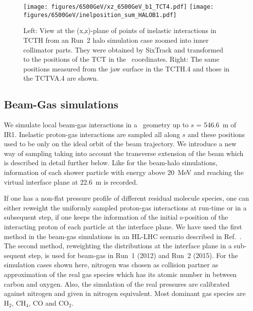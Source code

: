 \begin{figure}%
\begin{center}
  \texttt{[image: figures/6500GeV/xz\_6500GeV\_b1\_TCT4.pdf]}
  \texttt{[image: figures/6500GeV/inelposition\_sum\_HALOB1.pdf]}
\end{center}
\vspace{-0.6cm}
 \caption{Left: View at the (x,z)-plane of points of inelastic interactions in TCTH from an Run~2 halo simulation case zoomed into inner collimator parts. They were obtained by SixTrack and transformed to the positions of the TCT in the \fluka~coordinates. Right: The same positions measured from the jaw surface in the TCTH.4 and those in the TCTVA.4 are shown.
  \label{tctHits}}
\end{figure}


\subsection{Beam-Gas simulations \label{BGdescript}}

We simulate local beam-gas interactions in a \fluka~geometry up to $s$ = 546.6~m of IR1. Inelastic proton-gas interactions are sampled all along $s$ and these positions used to be only on the ideal orbit of the beam trajectory. We introduce a new way of sampling taking into account the transverse extension of the beam which is described in detail further below.
Like for the beam-halo simulations, information of each shower particle with energy above 20~MeV and reaching the virtual interface plane at 22.6~m is recorded.

If one has a non-flat pressure profile of different residual molecule species, one can either reweight the uniformly sampled proton-gas interactions at run-time or in a subsequent step, if one keeps the information of the initial s-position of the interacting proton of each particle at the interface plane. We have used the first method in the beam-gas simulations in an HL-LHC scenario described in Ref.~\cite{kweeIpac14}. The second method, reweighting the distributions at the interface plane in a sub-sequent step, is used for beam-gas in Run~1 (2012) and Run~2 (2015). For the simulation cases shown here, nitrogen was chosen as collision partner as approximation of the real gas species which has its atomic number in between carbon and oxygen. Also, the simulation of the real pressures are calibrated against nitrogen and given in nitrogen equivalent. Most dominant gas species are H$_2$, CH$_4$, CO and CO$_2$.

